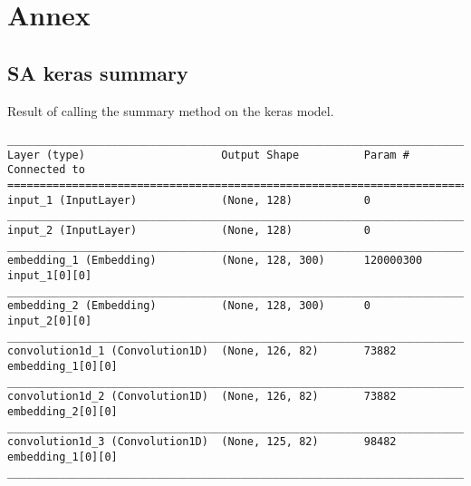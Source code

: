 \chapter{Annex}

\section{SA keras summary}
\singlespacing

Result of calling the summary method on the keras model.

\begin{lstlisting}[basicstyle=\tiny,frame=single]
____________________________________________________________________________________________________                                                                               
Layer (type)                     Output Shape          Param #     Connected to                                                                                                                              
====================================================================================================                                                                                                         
input_1 (InputLayer)             (None, 128)           0                                              
____________________________________________________________________________________________________  
input_2 (InputLayer)             (None, 128)           0                                              
____________________________________________________________________________________________________  
embedding_1 (Embedding)          (None, 128, 300)      120000300   input_1[0][0]                      
____________________________________________________________________________________________________  
embedding_2 (Embedding)          (None, 128, 300)      0           input_2[0][0]                      
____________________________________________________________________________________________________  
convolution1d_1 (Convolution1D)  (None, 126, 82)       73882       embedding_1[0][0]                  
____________________________________________________________________________________________________  
convolution1d_2 (Convolution1D)  (None, 126, 82)       73882       embedding_2[0][0]                  
____________________________________________________________________________________________________  
convolution1d_3 (Convolution1D)  (None, 125, 82)       98482       embedding_1[0][0]                  
____________________________________________________________________________________________________  

\end{lstlisting}
